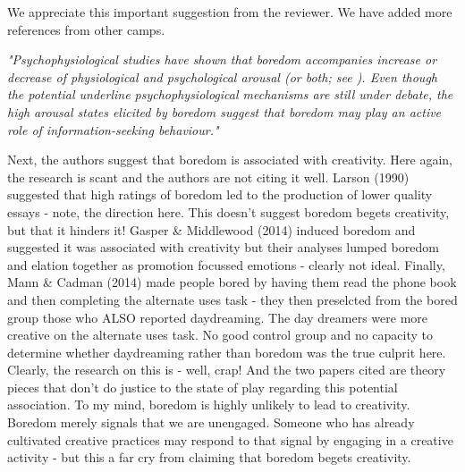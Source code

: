 \documentclass[utf8]{article}
\newenvironment{reply}  
    {\color{Blue}\noindent\newline}
    {\newline}
\begin{document}
        \begin{reply}
            We appreciate this important suggestion from the reviewer. We have added more references from other camps.
            
            \noindent
            \textit{
                "Psychophysiological studies have shown that boredom accompanies increase \citep{berlyne1960conflict, london1972increase, harris2000correlates} or decrease \citep{barmack1939definition, geiwitz1966structure, pattyn2008psychophysiological, vogel2012definition, mikulas1993essence} of physiological and psychological arousal (or both; see \cite{eastwood2012unengaged, fahlman2013development, Merrifield2014, Danckert.2018}). Even though the potential underline psychophysiological mechanisms are still under debate, the high arousal states elicited by boredom suggest that boredom may play an active role of information-seeking behaviour."}
        \end{reply}
        
        
         
        Next, the authors suggest that boredom is associated with creativity. Here again, the research is scant and the authors are not citing it well. Larson (1990) suggested that high ratings of boredom led to the production of lower quality essays - note, the direction here. This doesn't suggest boredom begets creativity, but that it hinders it! Gasper \& Middlewood (2014) induced boredom and suggested it was associated with creativity but their analyses lumped boredom and elation together as promotion focussed emotions - clearly not ideal. Finally, Mann \& Cadman (2014) made people bored by having them read the phone book and then completing the alternate uses task - they then preselcted from the bored group those who ALSO reported daydreaming. The day dreamers were more creative on the alternate uses task. No good control group and no capacity to determine whether daydreaming rather than boredom was the true culprit here. Clearly, the research on this is - well, crap! And the two papers cited are theory pieces that don't do justice to the state of play regarding this potential association. To my mind, boredom is highly unlikely to lead to creativity. Boredom merely signals that we are unengaged. Someone who has already cultivated creative practices may respond to that signal by engaging in a creative activity - but this a far cry from claiming that boredom begets creativity.
        
        
         
\end{document}

